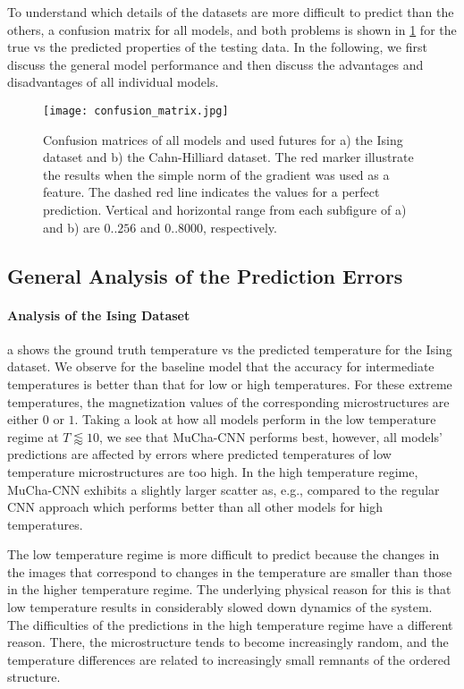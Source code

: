 \documentclass[11pt, authoryear]{elsarticle}
\begin{document}
	To understand which details of the datasets are more difficult to 
	predict than the others, a confusion matrix for all models, and both 
	problems is shown in \cref{fig:confusion_matrix} for the true vs 
	the predicted properties of the testing data.
	In the following, we first discuss the general model performance and 
	then discuss the advantages and disadvantages of all individual 
	models.
	\begin{figure}
		\centering
		\texttt{[image: confusion\_matrix.jpg]}
		\caption[]{%
			Confusion matrices of all models and used futures for  
			a) the Ising dataset and b) the Cahn-Hilliard dataset. The red marker 
			illustrate the results when the simple norm of the gradient 
			was used as a feature. The dashed red line indicates the 
			values for a perfect prediction. Vertical and horizontal range from 
			each subfigure of a) and b) are $0..256$ and $0..8000$, respectively.
		}
		\label{fig:confusion_matrix}
	\end{figure}	
	
	\subsection{General Analysis of the Prediction Errors}
	\paragraph{Analysis of the Ising Dataset}
	a shows the ground truth temperature 
	vs the predicted temperature for the Ising dataset. We observe for the baseline 
	model that the accuracy for intermediate temperatures is better than that for 
	low or high temperatures. For these extreme temperatures, the magnetization
	values of the corresponding microstructures are either $0$ or $1$. Taking a 
	look at how all models perform in the low temperature regime at 
	$T\lessapprox 10$, we see that MuCha-CNN performs best, however, all
	models' predictions are affected by errors where predicted temperatures of
	low temperature microstructures are too high.
	In the high temperature regime, MuCha-CNN exhibits a slightly larger scatter 
	as, e.g., compared to the regular CNN approach 
	which performs better than all other models for high temperatures. 
	
	The low temperature regime is more difficult to predict because the changes 
	in the images that correspond to changes in the temperature are smaller 
	than those in the higher temperature regime. The underlying physical reason 
	for this is that low temperature results in considerably slowed down 
	dynamics of the system. The difficulties of the predictions in the high 
	temperature regime have a different reason. There, the microstructure tends 
	to become increasingly random, and the temperature differences are related 
	to increasingly small remnants of the ordered structure.
	
\end{document}
